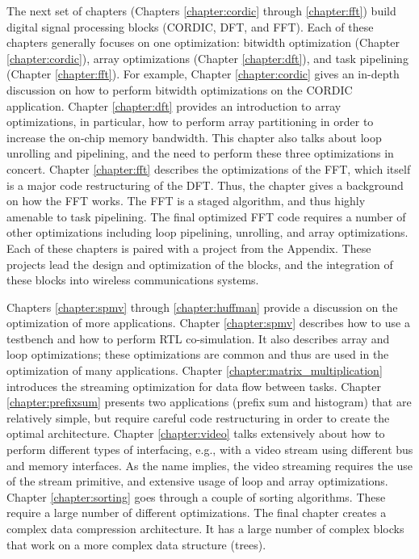 The next set of chapters (Chapters \ref{chapter:cordic} through \ref{chapter:fft}) build digital signal processing blocks (CORDIC, DFT, and FFT). Each of these chapters generally focuses on one optimization: bitwidth optimization (Chapter \ref{chapter:cordic}), array optimizations (Chapter \ref{chapter:dft}), and task pipelining (Chapter \ref{chapter:fft}). For example, Chapter \ref{chapter:cordic} gives an in-depth discussion on how to perform bitwidth optimizations on the CORDIC application.  Chapter \ref{chapter:dft} provides an introduction to array optimizations, in particular, how to perform array partitioning in order to increase the on-chip memory bandwidth. This chapter also talks about loop unrolling and pipelining, and the need to perform these three optimizations in concert. Chapter \ref{chapter:fft} describes the optimizations of the FFT, which itself is a major code restructuring of the DFT. Thus, the chapter gives a background on how the FFT works. The FFT is a staged algorithm, and thus highly amenable to task pipelining. The final optimized FFT code requires a number of other optimizations including loop pipelining, unrolling, and array optimizations. Each of these chapters is paired with a project from the Appendix. These projects lead the design and optimization of the blocks, and the integration of these blocks into wireless communications systems. 

Chapters \ref{chapter:spmv} through \ref{chapter:huffman} provide a discussion on the optimization of more applications. Chapter \ref{chapter:spmv} describes how to use a testbench and how to perform RTL co-simulation. It also describes array and loop optimizations; these optimizations are common and thus are used in the optimization of many applications. Chapter \ref{chapter:matrix_multiplication} introduces the streaming optimization for data flow between tasks. Chapter \ref{chapter:prefixsum} presents two applications (prefix sum and histogram) that are relatively simple, but require careful code restructuring in order to create the optimal architecture. Chapter \ref{chapter:video} talks extensively about how to perform different types of interfacing, e.g., with a video stream using different bus and memory interfaces. As the name implies, the video streaming requires the use of the stream primitive, and extensive usage of loop and array optimizations. Chapter \ref{chapter:sorting} goes through a couple of sorting algorithms. These require a large number of different optimizations. The final chapter creates a complex data compression architecture. It has a large number of complex blocks that work on a more complex data structure (trees). 

